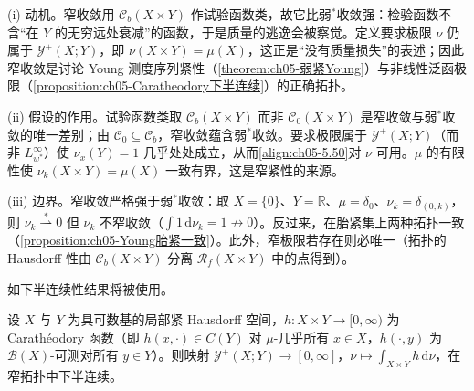 \documentclass[../../main.tex]{subfiles}%
\begin{document}
\begin{remark}\label{remark:ch05-Young窄动机}
(i) 动机。窄收敛用 $\mathcal{C}_b(X\times Y)$ 作试验函数类，故它比弱$^*$收敛强：检验函数不含“在 $Y$ 的无穷远处衰减”的函数，于是质量的逃逸会被察觉。定义要求极限 $\nu$ 仍属于 $\mathcal{Y}^+(X;Y)$，即 $\nu(X\times Y)=\mu(X)$，这正是“没有质量损失”的表述；因此窄收敛是讨论 Young 测度序列紧性（\cref{theorem:ch05-弱紧Young}）与非线性泛函极限（\cref{proposition:ch05-Caratheodory下半连续}）的正确拓扑。

(ii) 假设的作用。试验函数类取 $\mathcal{C}_b(X\times Y)$ 而非 $\mathcal{C}_0(X\times Y)$ 是窄收敛与弱$^*$收敛的唯一差别；由 $\mathcal{C}_0\subseteq\mathcal{C}_b$，窄收敛蕴含弱$^*$收敛。要求极限属于 $\mathcal{Y}^+(X;Y)$（而非 $L^\infty_{w^*}$）使 $\nu_x(Y)=1$ 几乎处处成立，从而\eqref{align:ch05-5.50}对 $\nu$ 可用。$\mu$ 的有限性使 $\nu_k(X\times Y)=\mu(X)$ 一致有界，这是窄紧性的来源。

(iii) 边界。窄收敛严格强于弱$^*$收敛：取 $X=\{0\}$、$Y=\mathbb{R}$、$\mu=\delta_0$、$\nu_k=\delta_{(0,k)}$，则 $\nu_k\stackrel{*}{\rightharpoonup}0$ 但 $\nu_k$ 不窄收敛（$\int1\,\mathrm{d}\nu_k=1\not\to0$）。反过来，在胎紧集上两种拓扑一致（\cref{proposition:ch05-Young胎紧一致}）。此外，窄极限若存在则必唯一（拓扑的 Hausdorff 性由 $\mathcal{C}_b(X\times Y)$ 分离 $\mathscr{R}_f(X\times Y)$ 中的点得到）。
\end{remark}

如下半连续性结果将被使用。

\begin{proposition}\label{proposition:ch05-Caratheodory下半连续}
设 $X$ 与 $Y$ 为具可数基的局部紧 Hausdorff 空间，$h:X\times Y\to[0,\infty)$ 为 Carathéodory 函数（即 $h(x,\cdot)\in C(Y)$ 对 $\mu$-几乎所有 $x\in X$，$h(\cdot,y)$ 为 $\mathscr{B}(X)$-可测对所有 $y\in Y$）。则映射 $\mathcal{Y}^+(X;Y)\to[0,\infty]$，$\nu\mapsto\int_{X\times Y}h\,\mathrm{d}\nu$，在窄拓扑中下半连续。
\end{proposition}
\end{document}
